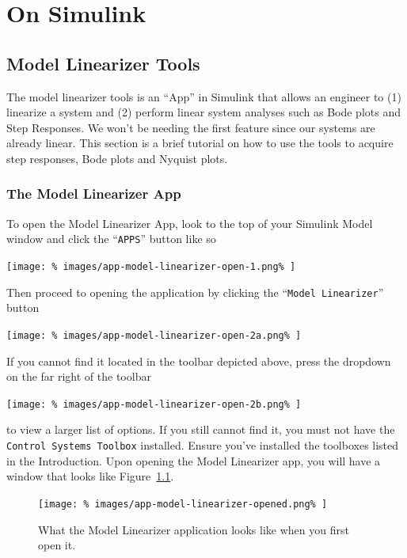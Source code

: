 \chapter{On Simulink}\label{App:Simulink}

\section{Model Linearizer Tools}\label{App:Simulink:ModelLinearizer}
The model linearizer tools is an ``App'' in Simulink that allows an engineer to
(1) linearize a system and (2) perform linear system analyses such as Bode
plots and Step Responses. We won't be needing the first feature since our
systems are already linear. This section is a brief tutorial on how to use
the tools to acquire step responses, Bode plots and Nyquist plots.

\subsection{The Model Linearizer App}
To open the Model Linearizer App, look to the top of your Simulink Model
window and click the ``\texttt{APPS}'' button like so
%
\begin{center}
  \texttt{[image: \%
    images/app-model-linearizer-open-1.png\%
  ]}
\end{center}
%
Then proceed to opening the application by clicking the ``\texttt{Model
Linearizer}'' button
%
\begin{center}
  \texttt{[image: \%
    images/app-model-linearizer-open-2a.png\%
  ]}
\end{center}
%
If you cannot find it located in the toolbar depicted above, press the
dropdown on the far right of the toolbar
%
\begin{center}
  \texttt{[image: \%
    images/app-model-linearizer-open-2b.png\%
  ]}
\end{center}
%
to view a larger list of options.
If you still cannot find it, you must not have the \texttt{Control Systems
Toolbox} installed. Ensure you've installed the toolboxes listed in the
Introduction. Upon opening the Model Linearizer app, you
will have a window that looks like Figure~\ref{fig:app1:model-linearizer}.
%
\begin{figure}[H]
  \centering
  \texttt{[image: \%
    images/app-model-linearizer-opened.png\%
  ]}
  \caption[The Model Linearizer App]{%
    What the Model Linearizer application looks like when you first open it.%
  }
  \label{fig:app1:model-linearizer}
\end{figure}

